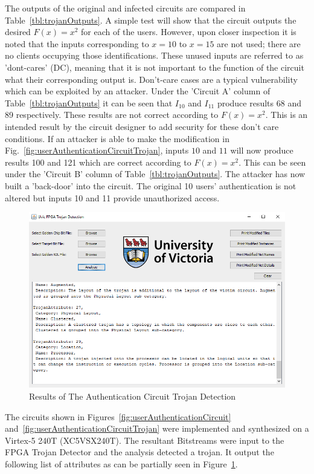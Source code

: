 \documentclass[journal, hidelinks]{IEEEtran}
\begin{document}
The outputs of the original and infected circuits are compared in Table~\ref{tbl:trojanOutputs}.
A simple test will show that the circuit outputs the desired $F(x) = x^2$ for each of the users.
However, upon closer inspection it is noted that the inputs corresponding to $x = 10$ to $x = 15$ are not used; there are no clients occupying those identifications.
These unused inputs are referred to as 'dont-cares' (DC), meaning that it is not important to the function of the circuit what their corresponding output is.
Don't-care cases are a typical vulnerability which can be exploited by an attacker.
Under the 'Circuit A' column of Table~\ref{tbl:trojanOutputs} it can be seen that $I_{10}$ and $I_{11}$ produce results 68 and 89 respectively.
These results are not correct according to $F(x) = x^2$.
This is an intended result by the circuit designer to add security for these don't care conditions.
If an attacker is able to make the modification in Fig.~\ref{fig:userAuthenticationCircuitTrojan}, inputs $10$ and $11$ will now produce results 100 and 121 which are correct according to $F(x) = x^2$.
This can be seen under the 'Circuit B' column of Table~\ref{tbl:trojanOutputs}.
The attacker has now built a 'back-door' into the circuit.
The original 10 users' authentication is not altered but inputs 10 and 11 provide unauthorized access.
\begin{figure}[b]
	\centering
	\includegraphics[width=0.7\linewidth]{Figures/backDoorResult}
	\caption[Results of The Authentication Circuit Trojan Detection]{Results of The Authentication Circuit Trojan Detection}
	\label{fig:backDoorResult}
\end{figure}

The circuits shown in Figures~\ref{fig:userAuthenticationCircuit} and~\ref{fig:userAuthenticationCircuitTrojan} were implemented and synthesized on a Virtex-5 240T  (XC5VSX240T).
The resultant Bitstreams were input to the FPGA Trojan Detector and the analysis detected a trojan.
It output the following list of attributes as can be partially seen in Figure~\ref{fig:backDoorResult}.
\end{document}
